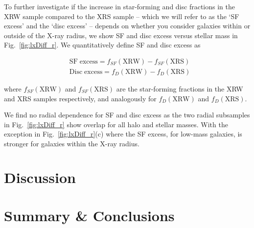 To further investigate if the increase in star-forming and disc
fractions in the XRW sample compared to the XRS sample -- which we
will refer to as the `SF excess' and the `disc excess' -- depends on
whether you consider galaxies within or outside of the X-ray radius,
we show SF and disc excess versus stellar mass in
Fig.~\ref{fig:lxDiff_r}.  We quantitatively define SF and disc excess
as

\begin{align}
  & \mathrm{SF}\;\mathrm{excess} = f_{SF}(\mathrm{XRW}) -
  f_{SF}(\mathrm{XRS}) \\
  & \mathrm{Disc}\;\mathrm{excess} = f_{D}(\mathrm{XRW}) -
  f_{D}(\mathrm{XRS})
\end{align}

\noindent
where $f_{SF}(\mathrm{XRW})$ and $f_{SF}(\mathrm{XRS})$ are the
star-forming fractions in the XRW and XRS samples respectively, and
analogously for $f_D(\mathrm{XRW})$ and $f_D(\mathrm{XRS})$.
\par
We find no radial dependence for SF and disc excess as the two radial
subsamples in Fig.~\ref{fig:lxDiff_r} show overlap for all halo and
stellar masses.  With the exception in Fig.~\ref{fig:lxDiff_r}(c) where
the SF excess, for low-mass galaxies, is stronger for galaxies within
the X-ray radius. 

\section{Discussion}
\label{sec:discussion_x}

\section{Summary \& Conclusions}
\label{sec:conclusions_x}

%


